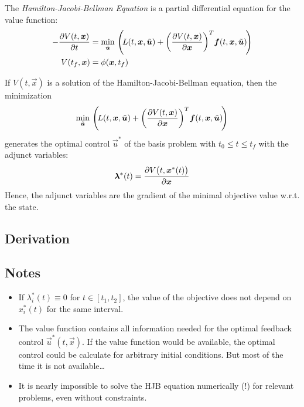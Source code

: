 		The \emph{Hamilton-Jacobi-Bellman Equation} is a partial differential equation for the value function:
		\begin{align*}
			-\pdv{V(t, \bm{x})}{t} &= \min_{\tilde{\bm{u}}} \, \Bigg(\! L(t, \bm{x}, \tilde{\bm{u}}) + \bigg( \pdv{V(t, \bm{x})}{\bm{x}} \bigg)^T \bm{f}(t, \bm{x}, \tilde{\bm{u}}) \!\Bigg) \\
			V(t_f, \bm{x}) &= \phi(\bm{x}, t_f)
		\end{align*}

		If \( V(t, \vec{x}) \) is a solution of the Hamilton-Jacobi-Bellman equation, then the minimization
		\begin{align*}
			\min_{\tilde{\bm{u}}} \, \Bigg(\! L(t, \bm{x}, \tilde{\bm{u}}) + \bigg( \pdv{V(t, \bm{x})}{\bm{x}} \bigg)^T \bm{f}(t, \bm{x}, \tilde{\bm{u}}) \!\Bigg)
		\end{align*}
		generates the optimal control \( \vec{u}^\ast \) of the basis problem with \( t_0 \leq t \leq t_f \) with the adjunct variables:
		\begin{align*}
			\bm{\lambda}^\ast(t) = \pdv{V\big(t, \bm{x}^\ast(t)\big)}{\bm{x}}
		\end{align*}
		Hence, the adjunct variables are the gradient of the minimal objective value w.r.t. the state.

		\subsection{Derivation} %

		\subsection{Notes}
			\begin{itemize}
				\item If \( \lambda_i^\ast(t) \equiv 0 \) for \( t \in [t_1, t_2] \), the value of the objective does not depend on \( x_i^\ast(t) \) for the same interval.
				\item The value function contains all information needed for the optimal feedback control \( \vec{u}^\ast(t, \vec{x}) \). If the value function would be available, the optimal control could be calculate for arbitrary initial conditions. But most of the time it is not available\dots
				\item It is nearly impossible to solve the HJB equation numerically (!) for relevant problems, even without constraints.
			\end{itemize}

